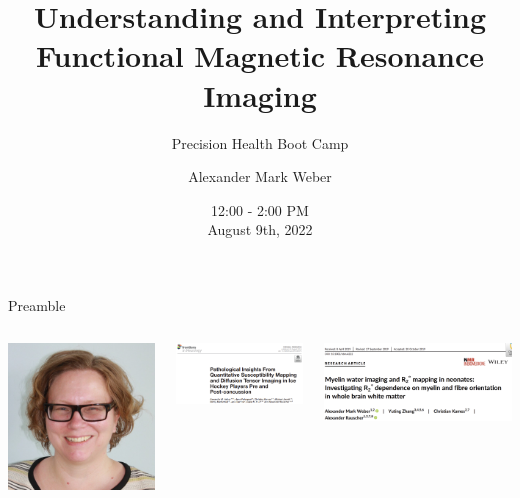 \documentclass[aspectratio=169,xcolor=dvipsnames]{beamer}
\title[Functional MRI: Part 2 of 2]{Understanding and Interpreting \\Functional Magnetic Resonance Imaging}
\subtitle{Precision Health Boot Camp}
\author[Dr. Alexander Mark Weber] {Alexander Mark Weber}
\institute[UBC] %
{
    Department of Pediatrics, Division of Neurology \\
    University of British Columbia 
    \vskip 3pt
}
\date{12:00 - 2:00 PM \\August 9th, 2022} %
\begin{document}
\begin{frame}
    \titlepage
\end{frame}

\begin{frame}{Preamble}

\begin{columns}[c]
\begin{center}
\includegraphics[width=.7\textwidth]{imgs/Lynne}
\end{center}


\includegraphics[width=.9\textwidth]{imgs/lit6}

\vspace{.2cm}

\includegraphics[width=.9\textwidth]{imgs/lit7}


\end{columns}
\end{frame}
\end{document}
